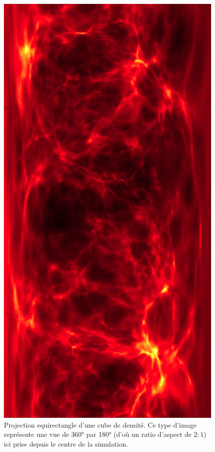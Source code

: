 \begin{figure}
        \includegraphics[height=.95\textheight]{img/04/equi.png} 
        \caption[Projection equirectangle]{Projection equirectangle d'une cube de densité.
        Ce type d'image représente une vue de 360° par 180° (d'où un ratio d'aspect de $2:1$) ici prise depuis le centre de la simulation.}
 		\label{fig:equirectangle}
\end{figure}

